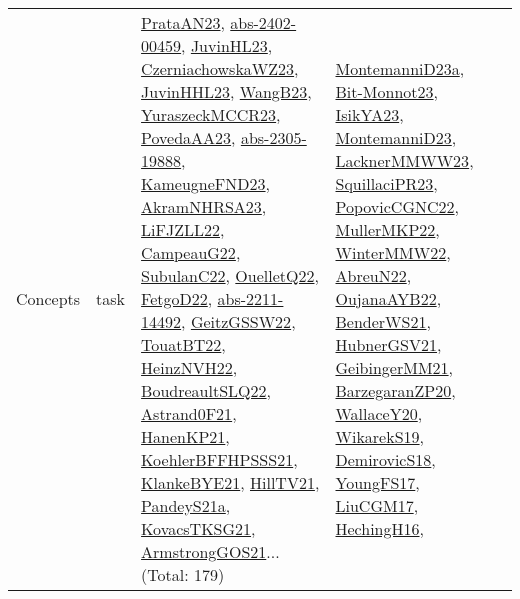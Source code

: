 {\begin{longtable}{lp{3cm}>{\raggedright}p{6cm}>{\raggedright}p{6cm}p{8cm}}
Concepts & task & \href{articles/PrataAN23.pdf}{PrataAN23}\cite{PrataAN23}, \href{articles/abs-2402-00459.pdf}{abs-2402-00459}\cite{abs-2402-00459}, \href{papers/JuvinHL23.pdf}{JuvinHL23}\cite{JuvinHL23}, \href{articles/CzerniachowskaWZ23.pdf}{CzerniachowskaWZ23}\cite{CzerniachowskaWZ23}, \href{papers/JuvinHHL23.pdf}{JuvinHHL23}\cite{JuvinHHL23}, \href{papers/WangB23.pdf}{WangB23}\cite{WangB23}, \href{articles/YuraszeckMCCR23.pdf}{YuraszeckMCCR23}\cite{YuraszeckMCCR23}, \href{papers/PovedaAA23.pdf}{PovedaAA23}\cite{PovedaAA23}, \href{articles/abs-2305-19888.pdf}{abs-2305-19888}\cite{abs-2305-19888}, \href{papers/KameugneFND23.pdf}{KameugneFND23}\cite{KameugneFND23}, \href{articles/AkramNHRSA23.pdf}{AkramNHRSA23}\cite{AkramNHRSA23}, \href{papers/LiFJZLL22.pdf}{LiFJZLL22}\cite{LiFJZLL22}, \href{articles/CampeauG22.pdf}{CampeauG22}\cite{CampeauG22}, \href{articles/SubulanC22.pdf}{SubulanC22}\cite{SubulanC22}, \href{papers/OuelletQ22.pdf}{OuelletQ22}\cite{OuelletQ22}, \href{articles/FetgoD22.pdf}{FetgoD22}\cite{FetgoD22}, \href{articles/abs-2211-14492.pdf}{abs-2211-14492}\cite{abs-2211-14492}, \href{papers/GeitzGSSW22.pdf}{GeitzGSSW22}\cite{GeitzGSSW22}, \href{papers/TouatBT22.pdf}{TouatBT22}\cite{TouatBT22}, \href{articles/HeinzNVH22.pdf}{HeinzNVH22}\cite{HeinzNVH22}, \href{papers/BoudreaultSLQ22.pdf}{BoudreaultSLQ22}\cite{BoudreaultSLQ22}, \href{papers/Astrand0F21.pdf}{Astrand0F21}\cite{Astrand0F21}, \href{papers/HanenKP21.pdf}{HanenKP21}\cite{HanenKP21}, \href{articles/KoehlerBFFHPSSS21.pdf}{KoehlerBFFHPSSS21}\cite{KoehlerBFFHPSSS21}, \href{papers/KlankeBYE21.pdf}{KlankeBYE21}\cite{KlankeBYE21}, \href{papers/HillTV21.pdf}{HillTV21}\cite{HillTV21}, \href{articles/PandeyS21a.pdf}{PandeyS21a}\cite{PandeyS21a}, \href{papers/KovacsTKSG21.pdf}{KovacsTKSG21}\cite{KovacsTKSG21}, \href{papers/ArmstrongGOS21.pdf}{ArmstrongGOS21}\cite{ArmstrongGOS21}... (Total: 179) & \href{articles/MontemanniD23a.pdf}{MontemanniD23a}\cite{MontemanniD23a}, \href{papers/Bit-Monnot23.pdf}{Bit-Monnot23}\cite{Bit-Monnot23}, \href{articles/IsikYA23.pdf}{IsikYA23}\cite{IsikYA23}, \href{articles/MontemanniD23.pdf}{MontemanniD23}\cite{MontemanniD23}, \href{articles/LacknerMMWW23.pdf}{LacknerMMWW23}\cite{LacknerMMWW23}, \href{papers/SquillaciPR23.pdf}{SquillaciPR23}\cite{SquillaciPR23}, \href{papers/PopovicCGNC22.pdf}{PopovicCGNC22}\cite{PopovicCGNC22}, \href{articles/MullerMKP22.pdf}{MullerMKP22}\cite{MullerMKP22}, \href{papers/WinterMMW22.pdf}{WinterMMW22}\cite{WinterMMW22}, \href{articles/AbreuN22.pdf}{AbreuN22}\cite{AbreuN22}, \href{papers/OujanaAYB22.pdf}{OujanaAYB22}\cite{OujanaAYB22}, \href{papers/BenderWS21.pdf}{BenderWS21}\cite{BenderWS21}, \href{articles/HubnerGSV21.pdf}{HubnerGSV21}\cite{HubnerGSV21}, \href{papers/GeibingerMM21.pdf}{GeibingerMM21}\cite{GeibingerMM21}, \href{papers/BarzegaranZP20.pdf}{BarzegaranZP20}\cite{BarzegaranZP20}, \href{articles/WallaceY20.pdf}{WallaceY20}\cite{WallaceY20}, \href{articles/WikarekS19.pdf}{WikarekS19}\cite{WikarekS19}, \href{papers/DemirovicS18.pdf}{DemirovicS18}\cite{DemirovicS18}, \href{papers/YoungFS17.pdf}{YoungFS17}\cite{YoungFS17}, \href{papers/LiuCGM17.pdf}{LiuCGM17}\cite{LiuCGM17}, \href{papers/HechingH16.pdf}{HechingH16}\cite{HechingH16}, 
\end{longtable}}
